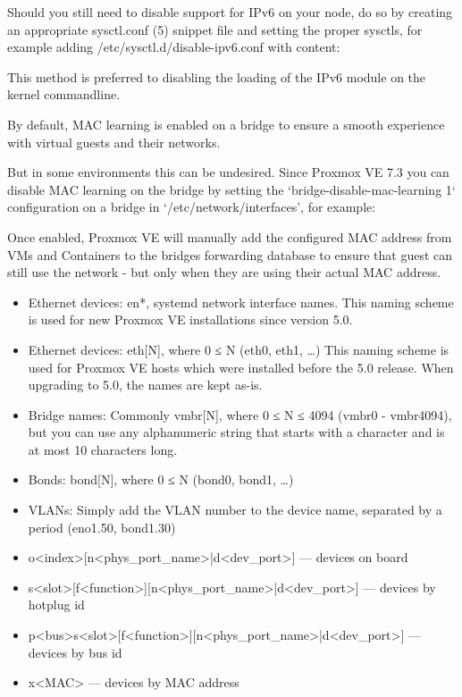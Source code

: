 Should you still need to disable support for IPv6 on your node, do so by creating an appropriate sysctl.conf (5) snippet file and setting the proper sysctls, for example adding /etc/sysctl.d/disable-ipv6.conf with content:

This method is preferred to disabling the loading of the IPv6 module on the kernel commandline.

By default, MAC learning is enabled on a bridge to ensure a smooth experience with virtual guests and their networks.

But in some environments this can be undesired. Since Proxmox VE 7.3 you can disable MAC learning on the bridge by setting the ‘bridge-disable-mac-learning 1` configuration on a bridge in `/etc/network/interfaces’, for example:

Once enabled, Proxmox VE will manually add the configured MAC address from VMs and Containers to the bridges forwarding database to ensure that guest can still use the network - but only when they are using their actual MAC address.

\begin{itemize}[leftmargin=2cm]

	\item Ethernet devices: en*, systemd network interface names. This naming scheme is used for new Proxmox VE installations since version 5.0.

	\item Ethernet devices: eth[N], where 0 ≤ N (eth0, eth1, …) This naming scheme is used for Proxmox VE hosts which were installed before the 5.0 release. When upgrading to 5.0, the names are kept as-is.

	\item Bridge names: Commonly vmbr[N], where 0 ≤ N ≤ 4094 (vmbr0 - vmbr4094), but you can use any alphanumeric string that starts with a character and is at most 10 characters long.

	\item Bonds: bond[N], where 0 ≤ N (bond0, bond1, …)

	\item VLANs: Simply add the VLAN number to the device name, separated by a period (eno1.50, bond1.30)

\end{itemize}

\begin{itemize}[leftmargin=2cm]

	\item o<index>[n<phys_port_name>|d<dev_port>] — devices on board

	\item s<slot>[f<function>][n<phys_port_name>|d<dev_port>] — devices by hotplug id

	\item [P<domain>]p<bus>s<slot>[f<function>][n<phys_port_name>|d<dev_port>] — devices by bus id

	\item x<MAC> — devices by MAC address

\end{itemize}

